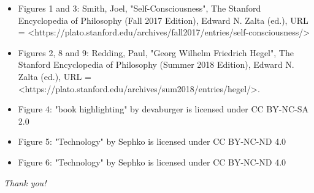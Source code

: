 \documentclass[unknownkeysallowed,usepdftitle=false, parskip=full]{beamer}
\newcommand{\secvariable}{nothing}
\begin{document}
\begin{frame}\label{\secvariable}
\small{  
  \begin{itemize}
 \item Figures 1 and 3: Smith, Joel, "Self-Consciousness", The Stanford Encyclopedia of Philosophy (Fall 2017 Edition), Edward N. Zalta (ed.), URL = <https://plato.stanford.edu/archives/fall2017/entries/self-consciousness/>
\item Figures 2, 8 and 9: Redding, Paul, "Georg Wilhelm Friedrich Hegel", The Stanford Encyclopedia of Philosophy (Summer 2018 Edition), Edward N. Zalta (ed.), URL = <https://plato.stanford.edu/archives/sum2018/entries/hegel/>.
\item Figure 4: "book highlighting" by devaburger is licensed under CC BY-NC-SA 2.0 
\item Figure 5: "Technology" by Sephko is licensed under CC BY-NC-ND 4.0 
\item Figure 6: "Technology" by Sephko is licensed under CC BY-NC-ND 4.0 

  \end{itemize}
}
 
\textit{Thank you!} 
  
\end{frame}
\end{document}
